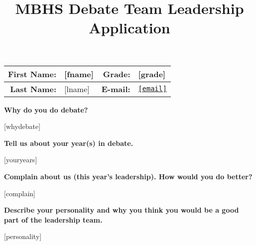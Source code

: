\documentclass[11pt]{article}
\title{MBHS Debate Team Leadership Application}
\author{}
\date{}
\newcommand{\fname}{[fname]}
\newcommand{\lname}{[lname]}
\newcommand{\email}{[email]}
\newcommand{\whydebate}{[whydebate]}
\newcommand{\youryears}{[youryears]}
\newcommand{\complain}{[complain]}
\newcommand{\personality}{[personality]}
\begin{document}
\maketitle
\thispagestyle{fancy}

\vspace{-6em}
\begin{center}
\begin{tabularx}{\textwidth}{|>{\bfseries}rX|>{\bfseries}rX|}
\hline
First Name: & \fname & Grade: & [grade]\\
\hline
Last Name: & \lname & E-mail: & \texttt{\href{mailto:\email}{\email}} \\
\hline
\end{tabularx}
\end{center}

\begin{samepage}\vspace{5pt}
\begin{flushleft}
\textbf{Why do you do debate?}
\end{flushleft}
\vspace{5pt}

\whydebate

\end{samepage}


\begin{samepage}\vspace{8pt}
\begin{flushleft}
\textbf{Tell us about your year(s) in debate.}
\end{flushleft}
\vspace{5pt}

\youryears

\end{samepage}


\begin{samepage}\vspace{8pt}
\begin{flushleft}
\textbf{Complain about us (this year’s leadership). How would you do better?}
\end{flushleft}
\vspace{5pt}

\complain

\end{samepage}


\begin{samepage}\vspace{8pt}
\begin{flushleft}
\textbf{Describe your personality and why you think you would be a good part of the leadership team.}
\end{flushleft}
\vspace{5pt}

\personality

\end{samepage}
\end{document}
